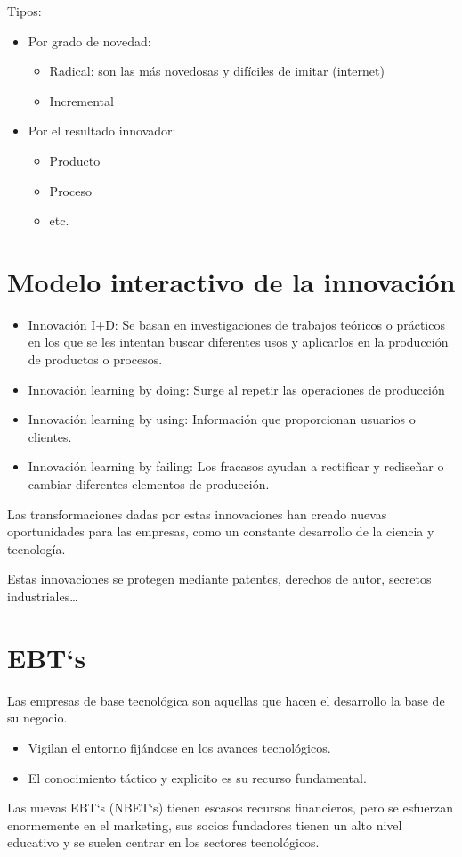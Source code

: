 \documentclass[12pt, twoside, openright]{report} %
\begin{document}
Tipos:
\begin{itemize}
	\item Por grado de novedad:
	\begin{itemize}
		\item Radical: son las más novedosas y difíciles de imitar (internet)
		\item Incremental
	\end{itemize}
	\item Por el resultado innovador:
	\begin{itemize}
		\item Producto
		\item Proceso
		\item etc.
	\end{itemize}
\end{itemize}

\section{Modelo interactivo de la innovación}
\begin{itemize}
	\item Innovación I+D: Se basan en investigaciones de trabajos teóricos o prácticos en los que se les intentan buscar diferentes usos y aplicarlos en la producción de productos o procesos.

	\item Innovación learning by doing: Surge al repetir las operaciones de producción

	\item Innovación learning by using: Información que proporcionan usuarios o clientes.

	\item Innovación learning by failing: Los fracasos ayudan a rectificar y rediseñar o cambiar diferentes elementos de producción.
\end{itemize}


Las transformaciones dadas por estas innovaciones han creado nuevas oportunidades para las
empresas, como un constante desarrollo de la ciencia y tecnología.

Estas innovaciones se protegen mediante patentes, derechos de autor, secretos industriales…
\pagebreak
\section{EBT`s}
Las empresas de base tecnológica son aquellas que hacen el desarrollo la base de su negocio.
\begin{itemize}
	\item Vigilan el entorno fijándose en los avances tecnológicos.
	\item El conocimiento táctico y explicito es su recurso fundamental.
\end{itemize}

Las nuevas EBT`s (NBET`s) tienen escasos recursos financieros, pero se esfuerzan enormemente en el
marketing, sus socios fundadores tienen un alto nivel educativo y se suelen centrar en los sectores
tecnológicos.
\end{document}
